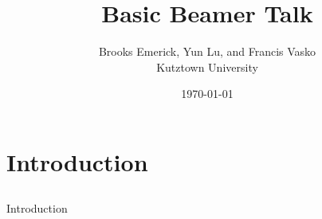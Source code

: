 \documentclass[graphics]{beamer}
\title[Talk]{Basic Beamer Talk}
\author[Brooks Emerick et. al. ]{Brooks Emerick, Yun Lu, and Francis Vasko \\ Kutztown University }
\institute[PIC 2022]{PIC Math Spring 2022 }
\date{\today }
\begin{document}

\begin{frame}
\titlepage 
\end{frame}





\section{Introduction} 
\subsection{} 
\begin{frame}
\begin{center}
\Huge{Introduction}
\end{center}
\end{frame}
\end{document}
